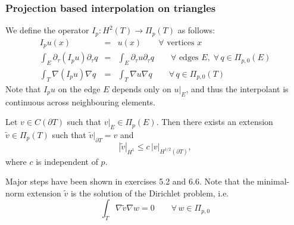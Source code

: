 \subsubsection{Projection based interpolation on triangles}

We define the operator $I_p : H^2(T) \rightarrow \Pi_p(T)$ as follows:
\begin{eqnarray}
I_p u(x) & = & u(x) \qquad \forall \text{ vertices } x \\
\int_E \partial_\tau (I_p u) \partial_\tau q & = &  
\int_E \partial_\tau u  \partial_\tau q \qquad \forall \text{ edges } E, \; \forall \, q \in \Pi_{p,0}(E) \\
\int_T \nabla (I_p u) \nabla q & = & \int_T \nabla u \nabla q \qquad \forall \, q \in \Pi_{p,0}(T)
\end{eqnarray}
Note that $I_p u$ on the edge $E$ depends  only on $u|_E$, and thus the interpolant is
continuous across neighbouring elements. 



\begin{lemma}  \label{lemma_polext}  Let $v \in C(\partial T)$ such that $v|_E \in \Pi_p(E)$. Then there exists
an extension $\tilde v \in \Pi_p(T)$ such that $\tilde v|_{\partial T} = v$ and
$$
| \tilde v |_{H^1} \leq c \, | v |_{H^{1/2}(\partial T)},
$$
where $c$ is independent of $p$.
\end{lemma}
Major steps have been shown in exercises 5.2 and 6.6.
Note that the minimal-norm extension $\tilde v$ is the solution of the Dirichlet problem, i.e.
$$
\int_T \nabla \tilde v \nabla w = 0 \qquad \forall \, w \in \Pi_{p,0}
$$

